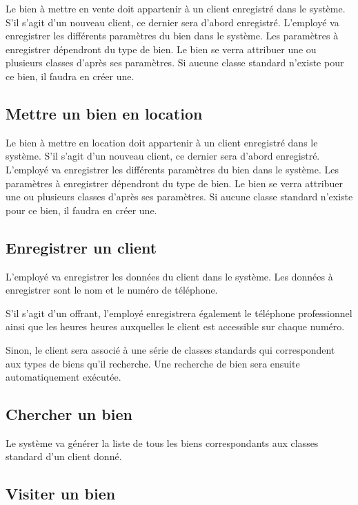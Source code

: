 Le bien à mettre en vente doit appartenir à un client enregistré dans le système. S'il s'agit d'un nouveau client, ce dernier sera d'abord enregistré. L'employé va enregistrer les différents paramètres du bien dans le système. Les paramètres à enregistrer dépendront du type de bien. Le bien se verra attribuer une ou plusieurs classes d'après ses paramètres. Si aucune classe standard n'existe pour ce bien, il faudra en créer une.

\subsection{Mettre un bien en location}

Le bien à mettre en location doit appartenir à un client enregistré dans le système. S'il s'agit d'un nouveau client, ce dernier sera d'abord enregistré. L'employé va enregistrer les différents paramètres du bien dans le système. Les paramètres à enregistrer dépendront du type de bien. Le bien se verra attribuer une ou plusieurs classes d'après ses paramètres. Si aucune classe standard n'existe pour ce bien, il faudra en créer une.

\subsection{Enregistrer un client}

L'employé va enregistrer les données du client dans le système. Les données à enregistrer sont le nom et le numéro de téléphone.

S'il s'agit d'un offrant, l'employé enregistrera également le téléphone professionnel ainsi que les heures heures auxquelles le client est accessible sur chaque numéro.

Sinon, le client sera associé à une série de classes standards qui correspondent aux types de biens qu'il recherche. Une recherche de bien sera ensuite automatiquement exécutée.

\subsection{Chercher un bien}

Le système va générer la liste de tous les biens correspondants aux classes standard d'un client donné.

\subsection{Visiter un bien}

